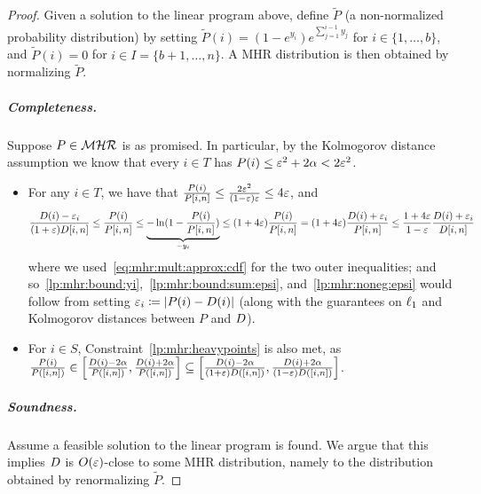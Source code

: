 \begin{proof}
Given a solution to the linear program above, define $\tilde{P}$ (a non-normalized probability distribution) by setting $\tilde{P}(i) = (1-e^{y_i})e^{\sum_{j=1}^{i-1} y_j}$ for $i\in \{1,\dots,b\}$, and $\tilde{P}(i) = 0$ for $i\in I = \{b+1,\dots, n\}$. A MHR distribution is then obtained by normalizing $\tilde{P}$. 

\subparagraph{Completeness.} Suppose $P\in\classmhr$ is as promised. In particular, by the Kolmogorov distance assumption we know that every $i\in T$ has $P(i) \leq \eps^2+2\alpha < 2\eps^2$.
\begin{itemize}
  \item For any $i\in T$, we have that $\frac{P(i)}{P[i,n]} \leq \frac{2\eps^2}{(1-\eps)\eps} \leq 4\eps$, and 
\begin{equation}
  \frac{\D(i)-\eps_i}{(1+\eps)\D[i,n]} \leq \frac{P(i)}{P[i,n]} \leq \underbrace{-\ln(1-\frac{P(i)}{P[i,n]})}_{-y_i}
  \leq (1+4\eps)\frac{P(i)}{P[i,n]} = (1+4\eps)\frac{\D(i)+\eps_i}{P[i,n]} \leq \frac{1+4\eps}{1-\eps}\frac{\D(i)+\eps_i}{\D[i,n]}
\end{equation}
where we used~\cref{eq:mhr:mult:approx:cdf} for the two outer inequalities; and so~\eqref{lp:mhr:bound:yi},~\eqref{lp:mhr:bound:sum:epsi}, and~\eqref{lp:mhr:noneg:epsi} would follow from setting $\eps_i \eqdef \abs{P(i)-\D(i)}$ (along with the guarantees on $\lp[1]$ and Kolmogorov distances between $P$ and $\D$).
  \item For $i\in S$, Constraint~\eqref{lp:mhr:heavypoints} is also met, as 
  $\frac{P(i)}{P([i,n])} \in \left[\frac{\D(i)-2\alpha}{P([i,n])},\frac{\D(i)+2\alpha}{P([i,n])}\right] 
    \subseteq \left[\frac{\D(i)-2\alpha}{(1+\eps)\D([i,n])},\frac{\D(i)+2\alpha}{(1-\eps)\D([i,n])}\right]$.
\end{itemize}

\subparagraph{Soundness.}
\noindent Assume a feasible solution to the linear program is found. We argue that this implies $\D$ is $\bigO{\eps}$-close to some MHR distribution, namely to the distribution obtained by renormalizing $\tilde{P}$.


\end{proof}
